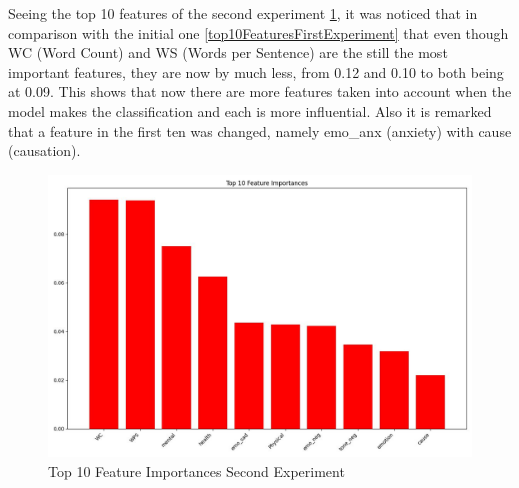 Seeing the top 10 features of the second experiment \ref{top10FeaturesSecondExperiment}, it was noticed that in comparison with the initial one \ref{top10FeaturesFirstExperiment} that even though WC (Word Count) and WS (Words per Sentence) are the still the most important features, they are now by much less, from 0.12 and 0.10 to both being at 0.09. This shows that now there are more features taken into account when the model makes the classification and each is more influential. Also it is remarked that a feature in the first ten was changed, namely emo\_anx (anxiety) with cause (causation).

\begin{figure}[htbp]
	\centering
		\includegraphics[scale=0.5]{LaTeX Bachelor Thesis Depression Signs Detection/figures/metrics/experiment2English/top10features.jpg}
	\caption{Top 10 Feature Importances Second Experiment}
	\label{top10FeaturesSecondExperiment}
\end{figure}



